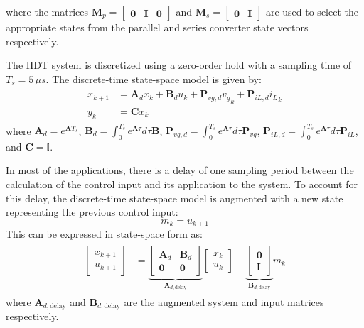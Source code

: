where the matrices $\mathbf{M}_p = \begin{bmatrix}\mathbf{0} & \mathbf{I} & \mathbf{0}\end{bmatrix}$ and $\mathbf{M}_s = \begin{bmatrix}\mathbf{0} & \mathbf{I}\end{bmatrix}$ are used to select the appropriate states from the parallel and series converter state vectors respectively.

The HDT system is discretized using a zero-order hold with a sampling time of $T_s = 5\,\mu s$. The discrete-time state-space model is given by:
\begin{align}
    \begin{aligned}
        x_{k + 1} &= \mathbf{A}_d x_k + \mathbf{B}_d u_k + \mathbf{P}_{vg,d} {v_g}_k + \mathbf{P}_{iL,d} {i_L}_k\\
        y_k &= \mathbf{C} x_k
    \end{aligned}
\end{align}
where $\mathbf{A}_d = e^{\mathbf{A}T_s}$, $\mathbf{B}_d = \int_0^{T_s} e^{\mathbf{A}\tau} d\tau \mathbf{B}$, $\mathbf{P}_{vg,d} = \int_0^{T_s} e^{\mathbf{A}\tau} d\tau \mathbf{P}_{vg}$, $\mathbf{P}_{iL,d} = \int_0^{T_s} e^{\mathbf{A}\tau} d\tau \mathbf{P}_{iL}$, and $\mathbf{C} = \mathbb{I}$.

In most of the applications, there is a delay of one sampling period between the calculation of the control input and its application to the system. To account for this delay, the discrete-time state-space model is augmented with a new state representing the previous control input:
\begin{equation}
    m_k = u_{k + 1}
\end{equation}
This can be expressed in state-space form as:
\begin{align}
    \begin{aligned}
        \begin{bmatrix}
            x_{k + 1}\\
            u_{k + 1}
        \end{bmatrix}
        &=
        \underbrace{
        \begin{bmatrix}
            \mathbf{A}_d & \mathbf{B}_d \\
            \mathbf{0} & \mathbf{0}
        \end{bmatrix}
        }_{\mathbf{A}_{d,\text{delay}}}
        \begin{bmatrix}
            x_k\\
            u_k
        \end{bmatrix}
        +
        \underbrace{
        \begin{bmatrix}
            \mathbf{0}\\
            \mathbf{I}
        \end{bmatrix}
        }_{\mathbf{B}_{d,\text{delay}}}
        m_k \label{eq:AugmentedModel}
    \end{aligned}
\end{align}
where $\mathbf{A}_{d,\text{delay}}$ and $\mathbf{B}_{d,\text{delay}}$ are the augmented system and input matrices respectively.